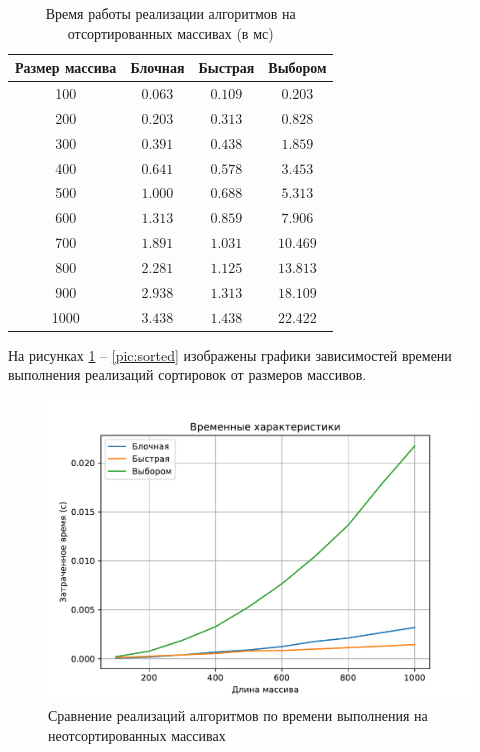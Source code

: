 \begin{table}[h]
	\begin{center}
		\begin{threeparttable}
			\captionsetup{justification=raggedright,singlelinecheck=off}
			\caption{Время работы реализации алгоритмов на отсортированных массивах (в мс)}
			\label{tbl:time_measurements_rand}
			\begin{tabular}{|c|c|c|c|}
				\hline
				Размер массива & Блочная & Быстрая & Выбором \\
				\hline
				100 &$ 0.063 $&$ 0.109 $&$ 0.203 $\\
				\hline
				200 &$ 0.203 $&$ 0.313 $&$ 0.828 $\\
				\hline
				300 &$ 0.391 $&$ 0.438 $&$ 1.859 $\\
				\hline
				400 &$ 0.641 $&$ 0.578 $&$ 3.453 $\\
				\hline
				500 &$ 1.000 $&$ 0.688 $&$ 5.313 $\\
				\hline
				600 &$ 1.313 $&$ 0.859 $&$ 7.906 $\\
				\hline
				700 &$ 1.891 $&$ 1.031 $&$ 10.469 $\\
				\hline
				800 &$ 2.281 $&$ 1.125 $&$ 13.813 $\\
				\hline
				900 &$ 2.938 $&$ 1.313 $&$ 18.109 $\\
				\hline
				1000 &$ 3.438 $&$ 1.438 $&$ 22.422 $\\
				\hline
			\end{tabular}
		\end{threeparttable}
	\end{center}
\end{table}

\clearpage
На рисунках \ref{pic:random} -- \ref{pic:sorted} изображены графики зависимостей времени выполнения реализаций сортировок от размеров массивов.

\begin{figure}[H]
	\centering
	\includegraphics[scale=0.62]{assets/plots/cpu-random.pdf}
	\caption{Сравнение реализаций алгоритмов по времени выполнения на неотсортированных массивах}
	\label{pic:random}
\end{figure}

